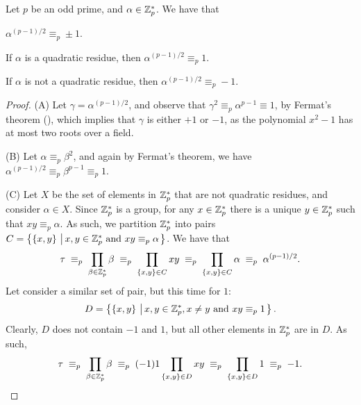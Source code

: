 \begin{theorem}
    Let $p$ be an odd prime, and $\alpha \in \mathbb{Z}_p^*$. We have that 
    \begin{compactenumA}
        \item $\alpha^{(p-1)/2} \equiv_p \pm 1$.
        \item If $\alpha$ is a quadratic residue, then
        $\alpha^{(p-1)/2} \equiv_p 1$.
        \item If $\alpha$ is not a quadratic residue, then
        $\alpha^{(p-1)/2} \equiv_p -1$.
    \end{compactenumA}
\end{theorem}
\begin{proof}
    (A) Let $\gamma = \alpha^{(p-1)/2}$, and observe that $\gamma^2
    \equiv_p \alpha^{p-1} \equiv 1$, by Fermat's theorem
    (), which implies that $\gamma$ is either
    $+1$ or $-1$, as the polynomial $x^2 -1$ has at most two roots
    over a field.

    \smallskip

    (B) Let $\alpha \equiv_p \beta^2$, and again by Fermat's theorem,
    we have $\alpha^{(p-1)/2} \equiv_p \beta^{p-1} \equiv_p 1$.

    \smallskip

    (C) Let $X$ be the set of elements in $\mathbb{Z}_p^*$ that are not
    quadratic residues, and consider $\alpha \in X$.  Since
    $\mathbb{Z}_p^*$ is a group, for any $x \in \mathbb{Z}_p^*$ there is a unique $y
    \in \mathbb{Z}_p^*$ such that $xy \equiv_p \alpha$.  As such, we
    partition $\mathbb{Z}_p^*$ into pairs $C = \left\{ { \left\{ {x, y} \right\} \,\left|\, { x, y
          \in \mathbb{Z}_p^* \text{ and } xy \equiv_p \alpha} \bigr.\right.} \right\}$. We have that
    \begin{align*}
        \ds \tau%
        \;\equiv_p\;%
        \prod_{\beta \in \ZZ_p^*} \beta%
        \;\equiv_p\;%
        \prod_{\brc{x,y} \in C} x y%
        \;\equiv_p\;%
        \prod_{\brc{x,y} \in C} \alpha%
        \;\equiv_p\;%
        \alpha^{(p-1)/2}.
    \end{align*}
    Let consider a similar set of pair, but this time for $1$: 
    \[
        D = \left\{ { \left\{ {x, y} \right\} \,\left|\, { x, y \in \mathbb{Z}_p^*, x \neq y \text{
                 and } xy \equiv_p 1} \bigr.\right.} \right\}.
    \]
    Clearly, $D$ does not contain $-1$ and $1$, but all other elements
    in $\mathbb{Z}_p^*$ are in $D$. As such,
    \begin{align*}
        \ds \tau%
        \;\equiv_p\;%
        \prod_{\beta \in \ZZ_p^*} \beta%
        \;\equiv_p\;%
        (-1) 1 \prod_{\brc{x,y} \in D} x y%
        \;\equiv_p\;%
        \prod_{\brc{x,y} \in D} 1%
        \;\equiv_p\;%
        -1.
    \end{align*}
\end{proof}


